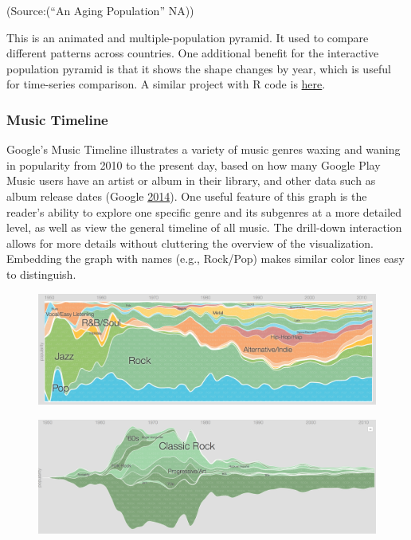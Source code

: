 \documentclass[]{book}
\theoremstyle{definition}
\theoremstyle{definition}
\theoremstyle{definition}
\theoremstyle{remark}
\begin{document}
(Source:(``An Aging Population'' NA))

This is an animated and multiple-population pyramid. It used to compare
different patterns across countries. One additional benefit for the
interactive population pyramid is that it shows the shape changes by
year, which is useful for time-series comparison. A similar project with
R code is
\href{https://www.r-bloggers.com/who-is-old-visualizing-the-concept-of-prospective-ageing-with-animated-population-pyramids/}{here}.

\subsubsection{Music Timeline}\label{music-timeline}

Google's Music Timeline illustrates a variety of music genres waxing and
waning in popularity from 2010 to the present day, based on how many
Google Play Music users have an artist or album in their library, and
other data such as album release dates (Google
\protect\hyperlink{ref-google_music}{2014}). One useful feature of this
graph is the reader's ability to explore one specific genre and its
subgenres at a more detailed level, as well as view the general timeline
of all music. The drill-down interaction allows for more details without
cluttering the overview of the visualization. Embedding the graph with
names (e.g., Rock/Pop) makes similar color lines easy to distinguish.

\begin{figure}
\centering
\includegraphics{images/music_timeline.png}
\caption{}
\end{figure}

\begin{figure}
\centering
\includegraphics{images/music_timeline_rock.png}
\caption{}
\end{figure}
\end{document}
